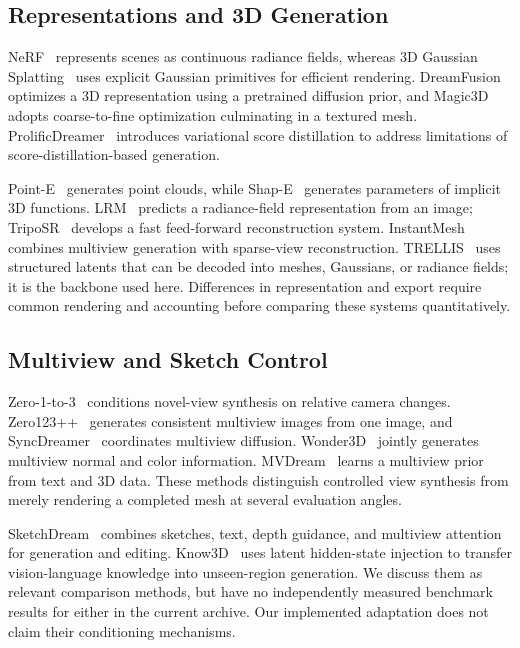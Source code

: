 \subsection{Representations and 3D Generation}
NeRF~\cite{mildenhall2020nerf} represents scenes as continuous radiance fields,
whereas 3D Gaussian Splatting~\cite{kerbl2023gaussians} uses explicit Gaussian
primitives for efficient rendering. DreamFusion~\cite{poole2022dreamfusion}
optimizes a 3D representation using a pretrained diffusion prior, and
Magic3D~\cite{lin2023magic3d} adopts coarse-to-fine optimization culminating in a
textured mesh. ProlificDreamer~\cite{wang2023prolific} introduces variational score
distillation to address limitations of score-distillation-based generation.

Point-E~\cite{nichol2022pointe} generates point clouds, while
Shap-E~\cite{jun2023shape} generates parameters of implicit 3D functions.
LRM~\cite{hong2023lrm} predicts a radiance-field representation from an image;
TripoSR~\cite{tochilkin2024triposr} develops a fast feed-forward reconstruction
system. InstantMesh~\cite{xu2024instantmesh} combines multiview generation with
sparse-view reconstruction. TRELLIS~\cite{xiang2025trellis} uses structured
latents that can be decoded into meshes, Gaussians, or radiance fields; it is the
backbone used here. Differences in representation and export require common
rendering and accounting before comparing these systems quantitatively.

\subsection{Multiview and Sketch Control}
Zero-1-to-3~\cite{liu2023zero123} conditions novel-view synthesis on relative
camera changes. Zero123++~\cite{shi2023zero123pp} generates consistent multiview
images from one image, and SyncDreamer~\cite{liu2023syncdreamer} coordinates
multiview diffusion. Wonder3D~\cite{long2023wonder3d} jointly generates multiview
normal and color information. MVDream~\cite{shi2023mvdream} learns a multiview
prior from text and 3D data. These methods distinguish controlled view synthesis
from merely rendering a completed mesh at several evaluation angles.

SketchDream~\cite{liu2024sketchdream} combines sketches, text, depth guidance,
and multiview attention for generation and editing. Know3D~\cite{chen2026know3d}
uses latent hidden-state injection to transfer vision-language knowledge into
unseen-region generation. We discuss them as relevant comparison methods, but
have no independently measured benchmark results for either in the current
archive. Our implemented adaptation does not claim their conditioning mechanisms.

